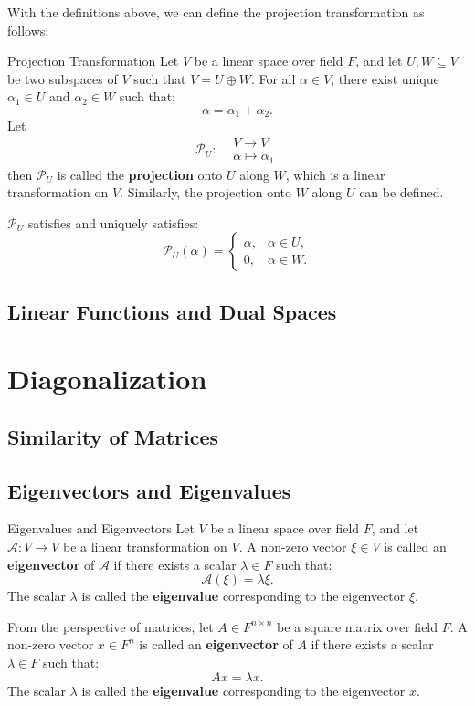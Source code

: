 \documentclass[11pt]{../../TexTemplate/elegantbook} %
\begin{document}
With the definitions above, we can define the projection transformation as follows:
\begin{definition}{Projection Transformation}
    Let \( V \) be a linear space over field \( F \),
    and let \( U, W \subseteq V \) be two subspaces of \( V \) such that \( V = U \oplus W \).
    For all \( \alpha \in V \), there exist unique \( \alpha_1 \in U \) and \( \alpha_2 \in W \) such that:
    \[
    \alpha = \alpha_1 + \alpha_2.
    \]
    Let
    \[ 
        \mathcal{P}_{U}: 
        \begin{aligned}
        &V \to V \\
        &\alpha \mapsto \alpha_1
        \end{aligned}
    \] 
    then \( \mathcal{P}_{U} \) is called the \textbf{projection} onto \( U \) along \( W \),
    which is a linear transformation on \( V \).
    Similarly, the projection onto \( W \) along \( U \) can be defined.
\end{definition}
\( \mathcal{P}_{U}\) satisfies and uniquely satisfies:
\[
\mathcal{P}_{U}( \alpha ) = 
\begin{cases} 
    \alpha, & \alpha \in U, \\ 
    0, & \alpha \in W .
\end{cases}
\]



\section{Linear Functions and Dual Spaces}



\chapter{Diagonalization}
\section{Similarity of Matrices}
\section{Eigenvectors and Eigenvalues}
\begin{definition}{Eigenvalues and Eigenvectors}
    Let \( V \) be a linear space over field \( F \), 
    and let \( \mathcal{A}: V \to V \) be a linear transformation on \( V \).
    A non-zero vector \( \xi \in V \) is called an \textbf{eigenvector} of \( \mathcal{A} \)
    if there exists a scalar \( \lambda \in F \) such that:
    \[
    \mathcal{A}(\xi) = \lambda \xi.
    \]
    The scalar \( \lambda \) is called the \textbf{eigenvalue} corresponding to the eigenvector \( \xi \).
    
    From the perspective of matrices,
    let \( A \in F^{n \times n} \) be a square matrix over field \( F \).
    A non-zero vector \( x \in F^n \) is called an \textbf{eigenvector} of \( A \)
    if there exists a scalar \( \lambda \in F \) such that:
    \[
    A x = \lambda x.
    \]
    The scalar \( \lambda \) is called the \textbf{eigenvalue} corresponding to the eigenvector \( x \).
\end{definition}
\end{document}
